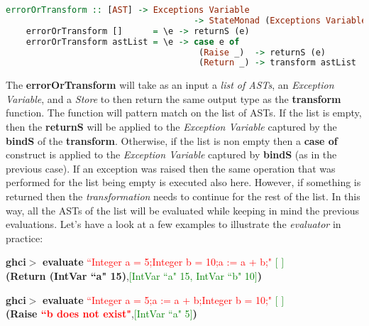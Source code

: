 \documentclass[a4paper, onecolumn]{article}
\begin{document}
    \begin{tcolorbox}
    \begin{lstlisting}[language=Haskell] 
    errorOrTransform :: [AST] -> Exceptions Variable 
                                     -> StateMonad (Exceptions Variable)
    errorOrTransform []      = \e -> returnS (e)
    errorOrTransform astList = \e -> case e of 
                                      (Raise _)  -> returnS (e) 
                                      (Return _) -> transform astList 
    \end{lstlisting}
    \end{tcolorbox}
    
    \noindent The \textbf{errorOrTransform} will take as an input a \textit{list of ASTs}, an \textit{Exception Variable}, and a \textit{Store} to then return the same output type as the \textbf{transform} function. The function will pattern match on the list of ASTs. If the list is empty, then the \textbf{returnS} will be applied to the \textit{Exception Variable} captured by the \textbf{bindS} of the \textbf{transform}. Otherwise, if the list is non empty then a \textbf{case of} construct is applied to the \textit{Exception Variable} captured by \textbf{bindS} (as in the previous case). If an exception was raised then the same operation that was performed for the list being empty is executed also here. However, if something is returned then the \textit{transformation} needs to continue for the rest of the list. In this way, all the ASTs of the list will be evaluated while keeping in mind the previous evaluations. Let's have a look at a few examples to illustrate the \textit{evaluator} in practice:
    
    \begin{center}
            \textbf{ghci$>$} \textbf{evaluate} \textcolor{red}{``Integer a = 5;Integer b = 10;a := a + b;"} \textcolor{green}{ $\big[$ $\big]$} \\
             \textbf{(Return (IntVar ``a" 15)},\textcolor{green}{$\big[$IntVar ``a" 15, IntVar ``b" 10$\big]$}\textbf{)}
        \end{center}
        
        \begin{center}
            \textbf{ghci$>$} \textbf{evaluate} \textcolor{red}{``Integer a = 5;a := a + b;Integer b = 10;"} \textcolor{green}{ $\big[$ $\big]$} \\
             \textbf{(Raise \textcolor{red}{``b does not exist"}},\textcolor{green}{$\big[$IntVar ``a" 5$\big]$}\textbf{)}
        \end{center}
        
\end{document}
